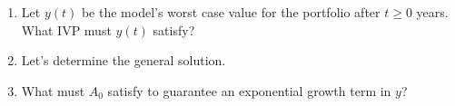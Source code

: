 \documentclass{ximera}
\begin{document}
\begin{enumerate}
\item Let $y(t)$ be the model's worst case value for the portfolio after $t\geq 0$ years.  What IVP must $y(t)$ satisfy?


\vfill

\item Let's determine the general solution.






\vfill
\vfill

\item What must $A_0$ satisfy to guarantee an exponential growth term in $y$?


\vfill


\end{enumerate}
\end{document}
